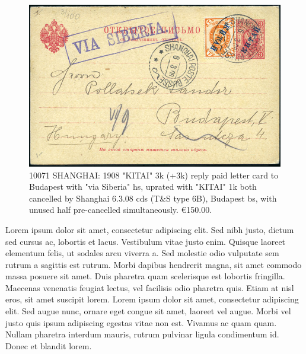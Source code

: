 \begin{figure}[htbp]
\centering
\includegraphics[width=.95\textwidth]{../russian-post-offices-in-china/10071.jpg}
\caption{
10071	SHANGHAI: 1908 "KITAI" 3k (+3k) reply paid letter card to Budapest 
with "via Siberia" hs, uprated with "KITAI" 1k both cancelled by Shanghai 
6.3.08 cds (T\&S type 6B), Budapest bs, with unused half pre-cancelled simultaneously.
\euro150.00. 
}  
\end{figure}

Lorem ipsum dolor sit amet, consectetur adipiscing elit. Sed nibh justo, dictum sed cursus ac, lobortis et lacus. Vestibulum vitae justo enim. Quisque laoreet elementum felis, ut sodales arcu viverra a. Sed molestie odio vulputate sem rutrum a sagittis est rutrum. Morbi dapibus hendrerit magna, sit amet commodo massa posuere sit amet. Duis pharetra quam scelerisque est lobortis fringilla. Maecenas venenatis feugiat lectus, vel facilisis odio pharetra quis. Etiam at nisl eros, sit amet suscipit lorem. Lorem ipsum dolor sit amet, consectetur adipiscing elit. Sed augue nunc, ornare eget congue sit amet, laoreet vel augue. Morbi vel justo quis ipsum adipiscing egestas vitae non est. Vivamus ac quam quam. Nullam pharetra
                                                    interdum mauris, rutrum pulvinar ligula condimentum id. Donec et blandit lorem. 

